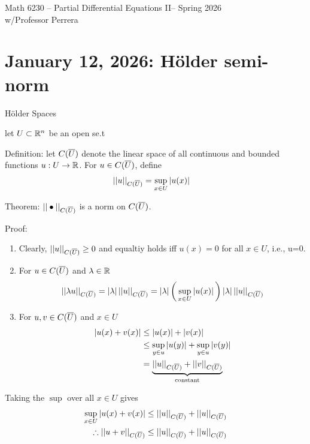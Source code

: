 \documentclass[12pt,a4paper]{report}
\newcommand{\CLASSNAME}{Math 6230 -- Partial Differential Equations II}
\newcommand{\PROFESSOR}{Professor Perrera}
\newcommand{\SEMESTER}{Spring 2026}
\newcommand{\CSPACE}{{C(\CONJ{U})}}
\newcommand{\CNORM}[1]{|| #1 ||_\CSPACE}
\begin{document}
\begin{center}
	\Large{\CLASSNAME -- \SEMESTER} \\
	\large{ w/\PROFESSOR}
\end{center}

\HLINE
\section*{January 12, 2026: H\"older semi-norm}

\begin{description}
	\item H\"older Spaces
	
	let $U \subset \mathbb{R}^n$ be an open se.t
	
	Definition: let $\CSPACE$ denote the linear space of all continuous and bounded functions $u:U\to \mathbb{R}$.  For $u \in \CSPACE$, define 
	\begin{align*}
		\CNORM{u} &= \sup_{x\in U} |u(x)|
	\end{align*}
	
	\item Theorem: $\CNORM{\bullet}$ is a norm on $\CSPACE$.
	
	Proof: \begin{enumerate}
		\item Clearly, $\CNORM{u} \ge 0$ and equaltiy holds iff $u(x) = 0$ for all $x \in U$, i.e., u=0.
		\item For $u\in \CSPACE$ and $\lambda \in \mathbb{R}$
		\begin{align*}
			\CNORM{\lambda u} = |\lambda| \,\CNORM{u} = |\lambda| \PAREN{\sup_{x\in U} |u(x)|} |\lambda|\,\CNORM{u}
		\end{align*}
		\item For $u,v \in \CSPACE$ and $x \in U$ \begin{align*}
			|u(x)+v(x)| &\le |u(x)|+|v(x)|\\
			&\le \sup_{y\in u}|u(y)|+\sup_{y\in u}|v(y)| \\
			&= \underbrace{\CNORM{u}+\CNORM{v}}_{\text{constant}}
		\end{align*}
		
	\end{enumerate}
	
	Taking the $\sup$ over all $x \in U$ gives 
	\begin{align*}
		\sup_{x\in U} |u(x)+v(x)| &\le \CNORM{u}+\CNORM{u} \\
		\therefore \CNORM{u+v} &\le  \CNORM{u}+\CNORM{u} 
	\end{align*}
	

\end{description}
\end{document}
